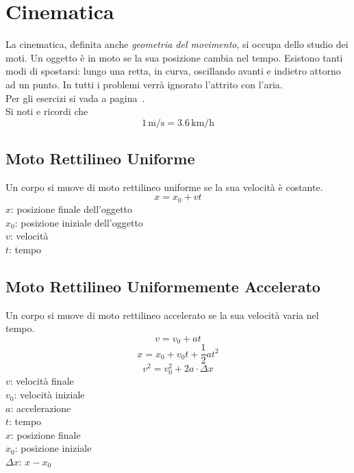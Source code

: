 
\section{Cinematica}\label{sec:cinematica}
La cinematica, definita anche \emph{geometria del movimento}, si occupa dello studio dei moti. Un 
oggetto è in moto se la sua posizione cambia nel tempo. Esistono tanti modi di spostarsi: lungo una
retta, in curva, oscillando avanti e indietro attorno ad un punto. In tutti i problemi verrà 
ignorato l'attrito con l'aria.\\
Per gli esercizi si vada a pagina~\pageref{ex:cinematica}.\\[\baselineskip]
Si noti e ricordi che
\begin{equation*}
  1\,\text{m/s} = 3.6\,\text{km/h}
\end{equation*}

\subsection{Moto Rettilineo Uniforme}\label{subsec:cinematica:mru}
Un corpo si muove di moto rettilineo uniforme se la sua velocità è costante.
\begin{equation*}
  x = x_0 + vt
\end{equation*}
$x$: posizione finale dell'oggetto\\
$x_0$: posizione iniziale dell'oggetto\\
$v$: velocità\\
$t$: tempo

\subsection{Moto Rettilineo Uniformemente Accelerato}
Un corpo si muove di moto rettilineo accelerato se la sua velocità varia nel tempo.
\begin{equation*}
  v = v_0 + at
\end{equation*}
\begin{equation*}
  x = x_0 + v_0t + \frac{1}{2}at^2
\end{equation*}
\begin{equation*}
  v^2 = v_0^2 + 2a\cdot\Delta x
\end{equation*}
$v$: velocità finale\\
$v_0$: velocità iniziale\\
$a$: accelerazione\\
$t$: tempo\\
$x$: posizione finale\\
$x_0$: posizione iniziale\\
$\Delta x$: $x - x_0$
